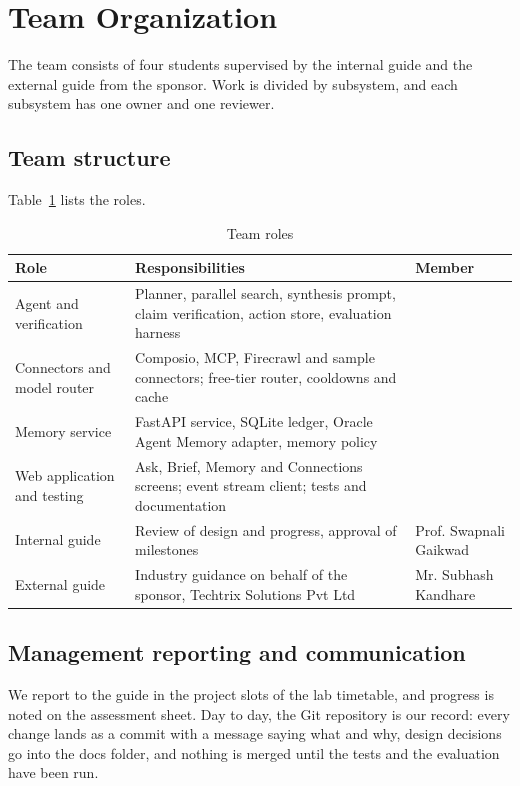 \documentclass[oneside,a4paper,12pt]{report}
\begin{document}
\section{Team Organization}
\label{sec:team}
The team consists of four students supervised by the internal guide and the external guide from the sponsor. Work is divided by subsystem, and each subsystem has one owner and one reviewer.
\subsection{Team structure}
Table~\ref{tab:roles} lists the roles.

\begin{table}[!htbp]
\begin{center}
\def\arraystretch{1.4}
\begin{tabularx}{\textwidth}{| p{4.2cm} | X | p{2.8cm} |}
\hline
Role & Responsibilities & Member \\ \hline
Agent and verification & Planner, parallel search, synthesis prompt, claim verification, action store, evaluation harness &  \\ \hline
Connectors and model router & Composio, MCP, Firecrawl and sample connectors; free-tier router, cooldowns and cache &  \\ \hline
Memory service & FastAPI service, SQLite ledger, Oracle Agent Memory adapter, memory policy &  \\ \hline
Web application and testing & Ask, Brief, Memory and Connections screens; event stream client; tests and documentation &  \\ \hline
Internal guide & Review of design and progress, approval of milestones & Prof. Swapnali Gaikwad \\ \hline
External guide & Industry guidance on behalf of the sponsor, Techtrix Solutions Pvt Ltd & Mr. Subhash Kandhare \\ \hline
\end{tabularx}
\end{center}
\caption{Team roles}
\label{tab:roles}
\end{table}

\subsection{Management reporting and communication}
We report to the guide in the project slots of the lab timetable, and progress is noted on the assessment sheet. Day to day, the Git repository is our record: every change lands as a commit with a message saying what and why, design decisions go into the docs folder, and nothing is merged until the tests and the evaluation have been run.
\end{document}
